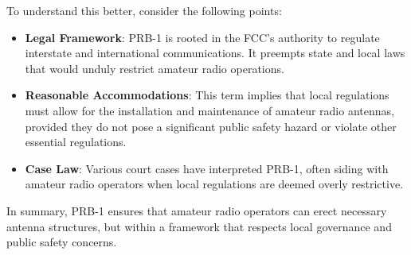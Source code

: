 To understand this better, consider the following points:
\begin{itemize}
    \item \textbf{Legal Framework}: PRB-1 is rooted in the FCC's authority to regulate interstate and international communications. It preempts state and local laws that would unduly restrict amateur radio operations.
    \item \textbf{Reasonable Accommodations}: This term implies that local regulations must allow for the installation and maintenance of amateur radio antennas, provided they do not pose a significant public safety hazard or violate other essential regulations.
    \item \textbf{Case Law}: Various court cases have interpreted PRB-1, often siding with amateur radio operators when local regulations are deemed overly restrictive.
\end{itemize}

In summary, PRB-1 ensures that amateur radio operators can erect necessary antenna structures, but within a framework that respects local governance and public safety concerns.

